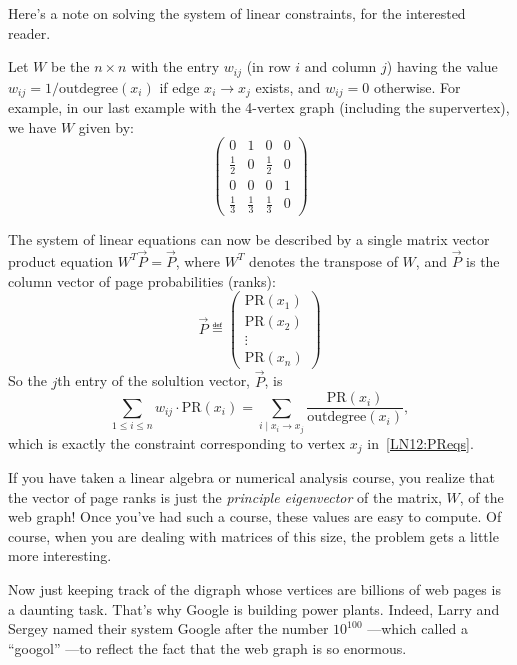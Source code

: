 \begin{staffnotes}
Here's a note on solving the system of linear constraints, for the
interested reader.

Let $W$ be the $n \times n$ with the entry $w_{ij}$ (in row $i$ and
column $j$) having the value $w_{ij} = 1/\text{outdegree}(x_i)$ if edge
$x_i \rightarrow x_j$ exists, and $w_{ij} = 0$ otherwise.  For example, in
our last example with the 4-vertex graph (including the supervertex), we have
$W$ given by:
\[
\left( \begin{array}{cccc}
    0 & 1 & 0 & 0 \\
    \frac{1}{2} & 0 & \frac{1}{2} & 0 \\
    0 & 0 & 0 & 1\\
    \frac{1}{3} & \frac{1}{3} & \frac{1}{3} & 0 \end{array} \right)
\]

The system of linear equations can now be described by a single matrix
vector product equation $W^T \vec{P} = \vec{P}$, where $W^T$ denotes the
transpose of $W$, and $\vec{P}$ is the column vector of page probabilities
(ranks):
\[\vec{P}\eqdef
\left( \begin{array}{c}
    \text{PR}(x_1) \\
    \text{PR}(x_2) \\
    \vdots \\
    \text{PR}(x_n) \end{array} \right)
\]
So the $j$th entry of the solultion vector, $\vec{P}$, is
\[
\sum_{1\leq i \leq n} w_{ij} \cdot \text{PR}(x_i) =
\sum_{i \mid x_i \rightarrow x_j} \frac{\text{PR}(x_i)}{\text{outdegree}(x_i)},
\]
which is exactly the constraint corresponding to vertex $x_j$
in~\eqref{LN12:PReqs}.

If you have taken a linear algebra or numerical analysis course, you
realize that the vector of page ranks is just the \emph{principle
  eigenvector} of the matrix, $W$, of the web graph!  Once you've had such
a course, these values are easy to compute.  Of course, when you are
dealing with matrices of this size, the problem gets a little more
interesting.

\end{staffnotes}

Now just keeping track of the digraph whose vertices are billions of web
pages is a daunting task.  That's why Google is building power plants.
Indeed, Larry and Sergey named their system Google after the number
$10^{100}$ ---which called a ``googol'' ---to reflect the fact that the
web graph is so enormous.

